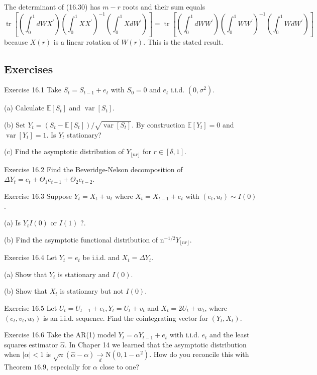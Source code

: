 \documentclass[10pt]{article}
\begin{document}
The determinant of (16.30) has $m-r$ roots and their sum equals
$$
\operatorname{tr}\left[\left(\int_{0}^{1} d W X^{\prime}\right)\left(\int_{0}^{1} X X^{\prime}\right)^{-1}\left(\int_{0}^{1} X d W^{\prime}\right)\right]=\operatorname{tr}\left[\left(\int_{0}^{1} d W W^{\prime}\right)\left(\int_{0}^{1} W W^{\prime}\right)^{-1}\left(\int_{0}^{1} W d W^{\prime}\right)\right]
$$
because $X(r)$ is a linear rotation of $W(r)$. This is the stated result.

\subsection{Exercises}
Exercise 16.1 Take $S_{t}=S_{t-1}+e_{t}$ with $S_{0}=0$ and $e_{t}$ i.i.d. $\left(0, \sigma^{2}\right)$.

(a) Calculate $\mathbb{E}\left[S_{t}\right]$ and $\operatorname{var}\left[S_{t}\right]$.

(b) Set $Y_{t}=\left(S_{t}-\mathbb{E}\left[S_{t}\right]\right) / \sqrt{\operatorname{var}\left[S_{t}\right]}$. By construction $\mathbb{E}\left[Y_{t}\right]=0$ and $\operatorname{var}\left[Y_{t}\right]=1$. Is $Y_{t}$ stationary?

(c) Find the asymptotic distribution of $Y_{\lfloor n r\rfloor}$ for $r \in[\delta, 1]$.

Exercise 16.2 Find the Beveridge-Nelson decomposition of $\Delta Y_{t}=e_{t}+\Theta_{1} e_{t-1}+\Theta_{2} e_{t-2}$.

Exercise 16.3 Suppose $Y_{t}=X_{t}+u_{t}$ where $X_{t}=X_{t-1}+e_{t}$ with $\left(e_{t}, u_{t}\right) \sim I(0)$.

(a) Is $Y_{t} I(0)$ or $I(1)$ ?.

(b) Find the asymptotic functional distribution of $\mathrm{n}^{-1 / 2} Y_{\lfloor n r\rfloor}$.

Exercise 16.4 Let $Y_{t}=e_{t}$ be i.i.d. and $X_{t}=\Delta Y_{t}$.

(a) Show that $Y_{t}$ is stationary and $I(0)$.

(b) Show that $X_{t}$ is stationary but not $I(0)$.

Exercise 16.5 Let $U_{t}=U_{t-1}+e_{t}, Y_{t}=U_{t}+v_{t}$ and $X_{t}=2 U_{t}+w_{t}$, where $\left(e_{t}, v_{t}, w_{t}\right)$ is an i.i.d. sequence. Find the cointegrating vector for $\left(Y_{t}, X_{t}\right)$.

Exercise 16.6 Take the AR(1) model $Y_{t}=\alpha Y_{t-1}+e_{t}$ with i.i.d. $e_{t}$ and the least squares estimator $\widehat{\alpha}$. In Chaper 14 we learned that the asymptotic distribution when $|\alpha|<1$ is $\sqrt{n}(\widehat{\alpha}-\alpha) \underset{d}{\longrightarrow} \mathrm{N}\left(0,1-\alpha^{2}\right)$. How do you reconcile this with Theorem $16.9$, especially for $\alpha$ close to one?
\end{document}
